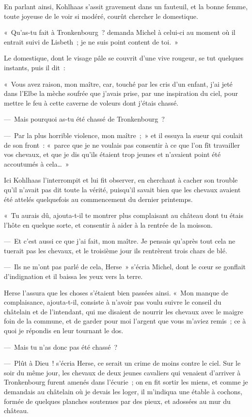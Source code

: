 \documentclass[french,twoside]{book} %
\begin{document}
En parlant ainsi, Kohlhaas s’assit gravement dans un fauteuil, et la bonne femme, toute joyeuse de le voir si modéré, courût chercher le domestique.\par
« Qu’as-tu fait à Tronkenbourg ? demanda Michel à celui-ci au moment où il entrait suivi de Lisbeth ; je ne suis point content de toi. »\par
Le domestique, dont le visage pâle se couvrit d’une vive rougeur, se tut quelques instants, puis il dit :\par
« Vous avez raison, mon maître, car, touché par les cris d’un enfant, j’ai jeté dans l’Elbe la mèche soufrée que j’avais prise, par une inspiration du ciel, pour mettre le feu à cette caverne de voleurs dont j’étais chassé.\par
— Mais pourquoi as-tu été chassé de Tronkenbourg ?\par
— Par la plus horrible violence, mon maître ; » et il essuya la sueur qui coulait de son front : « parce que je ne voulais pas consentir à ce que l’on fît travailler vos chevaux, et que je dis qu’ils étaient trop jeunes et n’avaient point été accoutumés à cela… »\par
Ici Kohlhaas l’interrompit et lui fit observer, en cherchant à cacher son trouble qu’il n’avait pas dit toute la vérité, puisqu’il savait bien que les chevaux avaient été attelés quelquefois au commencement du dernier printemps.\par
« Tu aurais dû, ajouta-t-il te montrer plus complaisant au château dont tu étais l’hôte en quelque sorte, et consentir à aider à la rentrée de la moisson.\par
— Et c’est aussi ce que j’ai fait, mon maître. Je pensais qu’après tout cela ne tuerait pas les chevaux, et le troisième jour ils rentrèrent trois chars de blé.\par
— Ils ne m’ont pas parlé de cela, Herse » s’écria Michel, dont le cœur se gonflait d’indignation et il baissa les yeux vers la terre.\par
Herse l’assura que les choses s’étaient bien passées ainsi. « Mon manque de complaisance, ajouta-t-il, consiste à n’avoir pas voulu suivre le conseil du châtelain et de l’intendant, qui me disaient de nourrir les chevaux avec le maigre foin de la commune, et de garder pour moi l’argent que vous m’aviez remis ; ce à quoi je répondis en leur tournant le dos.\par
— Mais tu n’as donc pas été chassé ?\par
— Plût à Dieu ! s’écria Herse, ce serait un crime de moins contre le ciel. Sur le soir du même jour, les chevaux de deux jeunes cavaliers qui venaient d’arriver à Tronkenbourg furent amenés dans l’écurie ; on en fit sortir les miens, et comme je demandais au châtelain où je devais les loger, il m’indiqua une étable à cochons, formée de quelques planches soutenues par des pieux, et adossées au mur du château.\par
\end{document}
